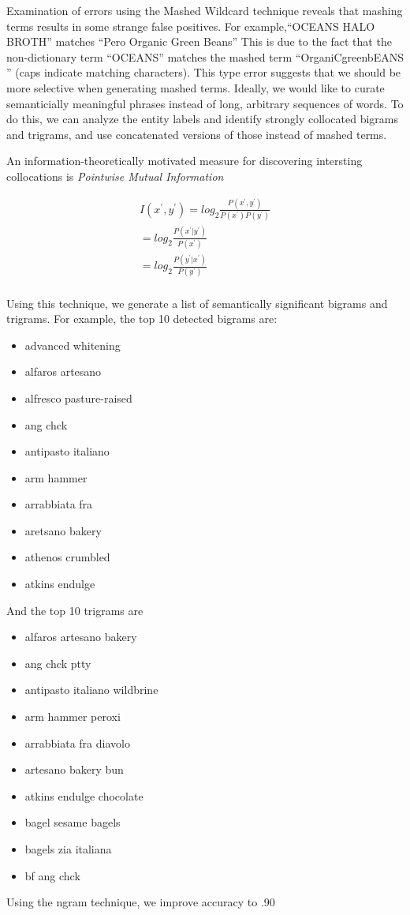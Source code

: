 \documentclass[11pt,a4paper]{article}
\newenvironment{myitemize}
{ \begin{itemize}
    \setlength{\itemsep}{0pt}
    \setlength{\parskip}{0pt}
    \setlength{\parsep}{0pt}     }
{ \end{itemize}                  }
\begin{document}
Examination of errors using the Mashed Wildcard technique reveals that
mashing terms results in some strange false positives.
For example,``OCEANS HALO BROTH'' matches ``Pero Organic Green Beans''
This is due to the fact that the non-dictionary term ``OCEANS''
matches the mashed term ``OrganiCgreenbEANS '' (caps indicate matching
characters).  This type error suggests that we should be more
selective when generating mashed terms.  Ideally, we would like to
curate semanticially meaningful phrases instead of long, arbitrary
sequences of words.  To do this, we can analyze the entity labels and
identify strongly collocated bigrams and trigrams, and use
concatenated versions of those instead of mashed terms.

An information-theoretically motivated measure for discovering
intersting collocations is {\em Pointwise Mutual Information}~\cite{manning:1999}

\begin{equation}
\begin{split}
  \label{eq:pmi}
  I(x^\prime,y^\prime) = log_2\frac{P(x^\prime,y^\prime)}{ P(x^\prime)P(y^\prime) } \\
  = log_2\frac{P(x^\prime|y^\prime)}{ P(x^\prime) } \\
  = log_2\frac{P(y^\prime|x^\prime)}{ P(y^\prime) } \\
\end{split}
\end{equation}

Using this technique, we generate a list of semantically significant
bigrams and trigrams.  For example, the top 10 detected bigrams are:
\begin{myitemize}
\item advanced whitening
\item alfaros artesano
\item alfresco pasture-raised
\item ang chck
\item antipasto italiano
\item arm hammer
\item arrabbiata fra
\item aretsano bakery
\item athenos crumbled
\item atkins endulge
\end{myitemize}
And the top 10 trigrams are
\begin{myitemize}
\item alfaros artesano bakery
\item ang chck ptty
\item antipasto italiano wildbrine
\item arm hammer peroxi
\item arrabbiata fra diavolo
\item artesano bakery bun
\item atkins endulge chocolate
\item bagel sesame bagels
\item bagels zia italiana
\item bf ang chck
\end{myitemize}
Using the ngram technique, we improve accuracy to .90
\end{document}
